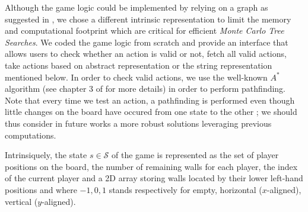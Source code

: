 \documentclass[journal, a4paper]{IEEEtran}
\begin{document}
Although the game logic could be implemented by relying on a graph as suggested in \cite{heuristic-agent}, we chose a different intrinsic representation to limit the memory and computational footprint which are critical for efficient \textit{Monte Carlo Tree Searches}. We coded the game logic from scratch and provide an interface that allows users to check whether an action is valid or not, fetch all valid actions, take actions based on abstract representation or the string representation mentioned below. In order to check valid actions, we use the well-known $A^*$ algorithm (see chapter 3 of \cite{russel2010} for more details) in order to perform pathfinding. Note that every time we test an action, a pathfinding is performed even though little changes on the board have occured from one state to the other ; we should thus consider in future works a more robust solutions leveraging previous computations.

Intrinsiquely, the state $s\in\mathcal{S}$ of the game is represented as the set of player positions on the board, the number of remaining walls for each player, the index of the current player and a 2D array storing walls located by their lower left-hand positions and where $-1, 0, 1$ stands respectively for empty, horizontal ($x$-aligned), vertical ($y$-aligned).
\end{document}

